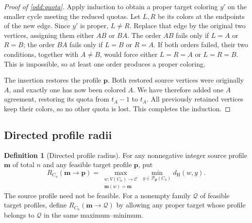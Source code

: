 \documentclass[10pt,a4paper]{amsart}
\numberwithin{equation}{section}
\theoremstyle{definition}
\newtheorem{definition}[theorem]{Definition}
\theoremstyle{remark}
\begin{document}
\begin{proof}[Proof of \cref{odd:quota}]
Apply induction to obtain a proper target coloring $y'$ on the
smaller cycle meeting the reduced quotas. Let $L,R$ be its colors at
the endpoints of the new edge. Since $y'$ is proper, $L\ne R$.
Replace that edge by the original two vertices, assigning them
either $AB$ or $BA$. The order $AB$ fails only if $L=A$ or $R=B$;
the order $BA$ fails only if $L=B$ or $R=A$.
If both orders failed, their two conditions, together with $A\ne B$,
would force either $L=R=A$ or $L=R=B$. This is impossible, so at
least one order produces a proper coloring.

The insertion restores the profile $\mathbf p$. Both restored source
vertices were originally $A$, and exactly one has now been colored
$A$. We have therefore added one $A$ agreement, restoring its quota
from $t_A-1$ to $t_A$. All previously retained vertices keep their
colors, so no other quota is lost. This completes the induction.
\end{proof}

\subsection{Directed profile radii}

\begin{definition}[Directed profile radius]\label{odd:directed-definition}
For any nonnegative integer source profile $\mathbf m$ of total $n$
and any feasible target profile $\mathbf p$, put
\[
 R_{C_n}(\mathbf m\to\mathbf p)
 =\max_{\substack{w:V(C_n)\to\mathcal C\\\mathbf m(w)=\mathbf m}}
   \min_{y\in\mathcal P_{\mathbf p}(C_n)}d_{\mathrm H}(w,y).
\]
The source profile need not be feasible.
For a nonempty family $\mathcal Q$ of feasible target profiles, define
$R_{C_n}(\mathbf m\to\mathcal Q)$ by allowing any proper target whose
profile belongs to $\mathcal Q$ in the same maximum--minimum.
\end{definition}
\end{document}
